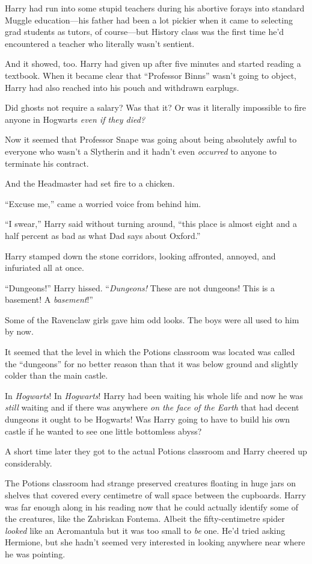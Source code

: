Harry had run into some stupid teachers during his abortive forays into standard Muggle education—his father had been a lot pickier when it came to selecting grad students as tutors, of course—but History class was the first time he’d encountered a teacher who literally wasn’t sentient.

And it showed, too. Harry had given up after five minutes and started reading a textbook. When it became clear that “Professor Binns” wasn’t going to object, Harry had also reached into his pouch and withdrawn earplugs.

Did ghosts not require a salary? Was that it? Or was it literally impossible to fire anyone in Hogwarts \emph{even if they died?}

Now it seemed that Professor Snape was going about being absolutely awful to everyone who wasn’t a Slytherin and it hadn’t even \emph{occurred} to anyone to terminate his contract.

And the Headmaster had set fire to a chicken.

“Excuse me,” came a worried voice from behind him.

“I swear,” Harry said without turning around, “this place is almost eight and a half percent as bad as what Dad says about Oxford.”

\later

Harry stamped down the stone corridors, looking affronted, annoyed, and infuriated all at once.

“Dungeons!” Harry hissed. “\emph{Dungeons!} These are not dungeons! This is a basement! A \emph{basement}!”

Some of the Ravenclaw girls gave him odd looks. The boys were all used to him by now.

It seemed that the level in which the Potions classroom was located was called the “dungeons” for no better reason than that it was below ground and slightly colder than the main castle.

In \emph{Hogwarts}! In \emph{Hogwarts}! Harry had been waiting his whole life and now he was \emph{still} waiting and if there was anywhere \emph{on the face of the Earth} that had decent dungeons it ought to be Hogwarts! Was Harry going to have to build his own castle if he wanted to see one little bottomless abyss?

A short time later they got to the actual Potions classroom and Harry cheered up considerably.

The Potions classroom had strange preserved creatures floating in huge jars on shelves that covered every centimetre of wall space between the cupboards. Harry was far enough along in his reading now that he could actually identify some of the creatures, like the Zabriskan Fontema. Albeit the fifty-centimetre spider \emph{looked} like an Acromantula but it was too small to \emph{be} one. He’d tried asking Hermione, but she hadn’t seemed very interested in looking anywhere near where he was pointing.

